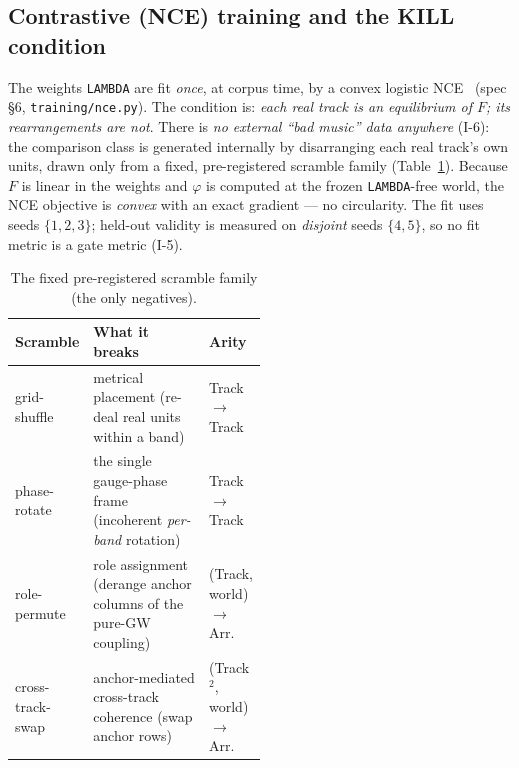 \documentclass[11pt]{article}
\newcommand{\code}[1]{\texttt{\small #1}}
\begin{document}
\subsection{Contrastive (NCE) training and the KILL condition}

The weights \code{LAMBDA} are fit \emph{once}, at corpus time, by a convex
logistic NCE~\cite{gutmann2010nce} (spec \S6, \code{training/nce.py}). The
condition is: \emph{each real track is an equilibrium of $F$; its rearrangements
are not}. There is \emph{no
external ``bad music'' data anywhere} (I-6): the comparison class is generated
internally by disarranging each real track's own units, drawn only from a fixed,
pre-registered scramble family (Table~\ref{tab:scramble}). Because $F$ is linear in
the weights and $\varphi$ is computed at the frozen \code{LAMBDA}-free world, the
NCE objective is \emph{convex} with an exact gradient --- no circularity. The fit
uses seeds $\{1,2,3\}$; held-out validity is measured on \emph{disjoint} seeds
$\{4,5\}$, so no fit metric is a gate metric (I-5).

\begin{table}[htbp]
\centering
\caption{The fixed pre-registered scramble family (the only negatives).}
\label{tab:scramble}
\small
\begin{tabular}{@{}l >{\raggedright\arraybackslash}p{0.50\linewidth} l@{}}
\toprule
Scramble & What it breaks & Arity \\
\midrule
grid-shuffle & metrical placement (re-deal real units within a band) & Track$\rightarrow$Track \\
phase-rotate & the single gauge-phase frame (incoherent \emph{per-band} rotation) & Track$\rightarrow$Track \\
role-permute & role assignment (derange anchor columns of the pure-GW coupling) & (Track, world)$\rightarrow$Arr. \\
cross-track-swap & anchor-mediated cross-track coherence (swap anchor rows) & (Track$^2$, world)$\rightarrow$Arr. \\
\bottomrule
\end{tabular}
\end{table}
\end{document}
